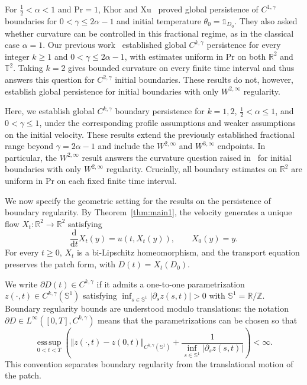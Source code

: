\documentclass[reqno,11pt,a4paper]{amsart}
\newcommand{\dd}{\mathrm{d}}
\begin{document}
For $\frac12<\alpha<1$ and $\mathrm{Pr}=1$,
Khor and Xu~\cite{KX22} proved global persistence
of $C^{1,\gamma}$ boundaries for
$0<\gamma\leq2\alpha-1$ and initial temperature
$\theta_0=\mathds{1}_{D_0}$.
They also asked whether curvature can be controlled
in this fractional regime, as in the classical case
$\alpha=1$.
Our previous work~\cite{LXY25} established global
$C^{k,\gamma}$ persistence for every integer $k\geq1$
and $0<\gamma\leq2\alpha-1$, %
with estimates uniform in
$\mathrm{Pr}$ on both $\mathbb R^2$ and $\mathbb T^2$.
Taking $k=2$ gives bounded curvature on every finite
time interval and thus answers this question
for $C^{2,\gamma}$ initial boundaries.
These results do not, however, establish global persistence
for initial boundaries with only $W^{2,\infty}$ regularity.

Here, we establish global $C^{k,\gamma}$ boundary persistence
for $k=1,2$, $\frac12<\alpha\leq1$, and $0<\gamma\leq1$,
under the corresponding profile assumptions
and weaker assumptions on the initial velocity.
These results extend the previously established fractional
range beyond $\gamma=2\alpha-1$ and include the
$W^{2,\infty}$ and $W^{3,\infty}$ endpoints.
In particular, the $W^{2,\infty}$ result answers
the curvature question raised in~\cite{KX22}
for initial boundaries with only $W^{2,\infty}$ regularity.
Crucially, all boundary estimates on $\mathbb R^2$ are uniform
in $\mathrm{Pr}$ on each fixed finite time interval.

We now specify the geometric setting for the results
on the persistence of boundary regularity.
By Theorem~\ref{thm:main1}, the velocity generates a unique flow
$X_t\colon\mathbb R^2\to\mathbb R^2$ satisfying
\begin{equation}\label{eq:flowmap}
  \frac{\dd}{\dd t}X_t(y)=u(t,X_t(y)),
  \qquad X_0(y)=y.
\end{equation}
For every $t\geq0$, $X_t$ is a bi-Lipschitz homeomorphism,
and the transport equation preserves the patch form,
with $D(t)=X_t(D_0)$.

We write $\partial D(t)\in C^{k,\gamma}$ if it admits
a one-to-one parametrization
$z(\cdot,t)\in C^{k,\gamma}(\mathbb S^1)$ satisfying
$\inf_{s\in\mathbb S^1}|\partial_s z(s,t)|>0$ with
$\mathbb S^1=\mathbb R/\mathbb Z$.
Boundary regularity bounds are understood modulo translations:
the notation
$\partial D\in L^\infty([0,T],C^{k,\gamma})$
means that the parametrizations can be chosen so that
\[
  \operatorname*{ess\,sup}_{0<t<T}
  \left(
    \Vert z(\cdot,t)-z(0,t)\Vert _{C^{k,\gamma}(\mathbb S^1)}
    +\frac{1}{
      \inf_{s\in\mathbb S^1}|\partial_s z(s,t)|}
  \right)<\infty.
\]
This convention separates boundary regularity
from the translational motion of the patch.
\end{document}

